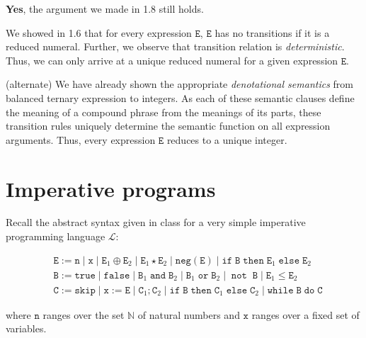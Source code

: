 \documentclass[a4paper,10pt]{article}
\newcommand{\E}{\mathtt{E}}
\newcommand{\B}{\mathtt{B}}
\newcommand{\C}{\mathtt{C}}
\newcommand{\true}{\mathtt{true}}
\newcommand{\false}{\mathtt{false}}
\newcommand{\andsym}{\mathtt{and}}
\newcommand{\orsym}{\mathtt{or}}
\newcommand{\notsym}{\mathop{\mathtt{not}}}
\newcommand{\ifsym}{\mathtt{if}}
\newcommand{\then}{\mathtt{then}}
\newcommand{\elsesym}{\mathtt{else}}
\newcommand{\whilesym}{\mathtt{while}}
\newcommand{\dosym}{\mathtt{do}}
\newcommand{\skipsym}{\mathtt{skip}}
\newcommand{\negation}{\mathtt{neg}}
\newcommand{\question}[1]
{\color{DarkBlue}#1 \color{Black} \newline}
\begin{document}
\begin{enumerate}
\textbf{Yes}, the argument we made in 1.8 still holds. 

\proof
We showed in 1.6 that for every expression $\E$, $\E$ has no transitions if it
is a reduced numeral. Further, we observe that transition relation is
\textit{deterministic}. Thus, 
we can only arrive at a unique reduced numeral for a given expression $\E$.

\proof (alternate)
We have already shown the appropriate \textit{denotational
semantics} from balanced ternary expression to integers. 
As each of these semantic clauses define the meaning of a compound
phrase from the meanings of its parts, these transition rules uniquely 
determine the semantic function on all expression arguments.
Thus, every expression $\E$ reduces to a unique integer.


\end{enumerate}



\section{Imperative programs}

\question{
Recall the abstract syntax given in class for a very simple imperative programming language $\mathcal{L}$:

\begin{align*}
& \E := \mathtt{n} \; | \; \mathtt{x} \; | \; \E_1 \oplus \E_2 \; | \; \E_1 \star \E_2 \; | \; \negation(\E) \; | \; \ifsym \; \B \; \then \; \E_1 \; \elsesym \; \E_2 \\ 
& \B := \true \; | \; \false \; | \; \B_1 \; \andsym \; \B_2 \; | \; \B_1 \; \orsym \; \B_2 \; | \; \notsym \; \B \; | \; \E_1 \leq \E_2 \\
& \C := \skipsym \; | \; \mathtt{x} := \E \; | \; \C_1 ; \C_2 \; | \; \ifsym \; \B \; \then \; \C_1 \; \elsesym \; \C_2 \; | \; \whilesym \; \B \; \dosym \; \C
\end{align*}

where $\mathtt{n}$ ranges over the set $\mathbb{N}$ of natural numbers and $\mathtt{x}$ 
ranges over a fixed set of variables.
}
\end{document}
